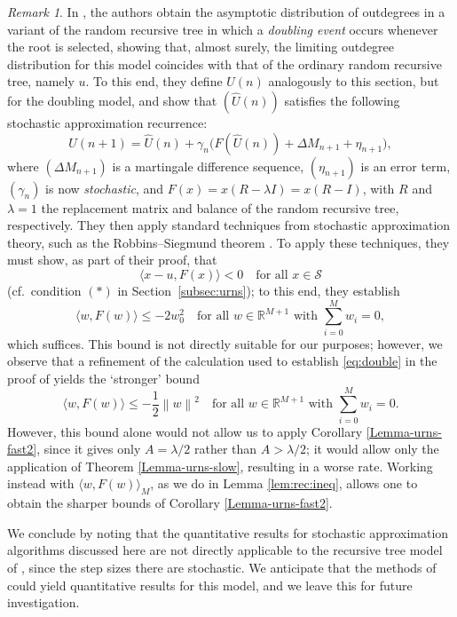 \documentclass[12pt]{amsart}
\theoremstyle{definition}
\theoremstyle{remark}
\newtheorem{remark}[theorem]{Remark}
\newcommand{\norm}[1]{\left\lVert#1\right\rVert}
\begin{document}
\begin{remark}
In \cite[Theorem 1.3]{bjornberg2025random}, the authors obtain the asymptotic distribution of outdegrees in a variant of the random recursive tree in which a \emph{doubling event} occurs whenever the root is selected, showing that, almost surely, the limiting outdegree distribution for this model coincides with that of the ordinary random recursive tree, namely $u$. To this end, they define $U(n)$ analogously to this section, but for the doubling model, and show that  $(\hat{U}(n))$ satisfies the following stochastic approximation recurrence:
\[
    \hat{U}(n+1) = \hat{U}(n) + \gamma_n\bigl(F(\hat{U}(n)) + \Delta M_{n+1} 
    + \eta_{n+1}\bigr),
\]
where $(\Delta M_{n+1})$ is a martingale difference sequence, $(\eta_{n+1})$ is an error term, $(\gamma_n)$ is now \emph{stochastic}, and $F(x) = x(R - \lambda I) = x(R - I)$, with $R$ and $\lambda = 1$ the replacement matrix and balance of the random recursive tree, respectively. They then apply standard techniques from stochastic approximation theory, such as the Robbins--Siegmund theorem \cite{robbins-siegmund:71:lemma}. To apply these techniques, they must show, as part of their proof, that
\[
\langle x - u, F(x) \rangle < 0 \quad \text{for all } x \in \mathcal{S}
\]
(cf.\ condition $(*)$ in Section~\ref{subsec:urns}); to this end, they establish
\begin{equation}
\label{eq:double}
    \langle w, F(w)\rangle \leq -2w_0^2 
\quad \text{for all } w \in \mathbb{R}^{M+1} \text{ with } 
\sum_{i=0}^{M} w_i = 0,
\end{equation}
which suffices. This bound is not directly suitable for our purposes; however, we observe that a refinement of the calculation used to establish \eqref{eq:double} in the proof of \cite[Theorem~1.3]{bjornberg2025random} yields the `stronger' bound
\[
    \langle w, F(w)\rangle \leq -\frac{1}{2}\norm{w}^2 
\quad \text{for all } w \in \mathbb{R}^{M+1} \text{ with } 
\sum_{i=0}^{M} w_i = 0.
\]
However, this bound alone would not allow us to apply Corollary \ref{Lemma-urns-fast2}, since it gives only $A = \lambda/2$ rather than $A > \lambda/2$; it would allow only the application of Theorem \ref{Lemma-urns-slow}, resulting in a worse rate. Working instead with $\langle w, F(w)\rangle_M$, as we do in Lemma \ref{lem:rec:ineq}, allows one to obtain the sharper bounds of Corollary \ref{Lemma-urns-fast2}.

We conclude by noting that the quantitative results for stochastic approximation algorithms discussed here are not directly applicable to the recursive tree model of \cite{bjornberg2025random}, since the step sizes there are stochastic. We anticipate that the methods of \cite{NeriPowell2026,mythesis} could yield quantitative results for this model, and we leave this for future investigation.
\end{remark}
\end{document}
